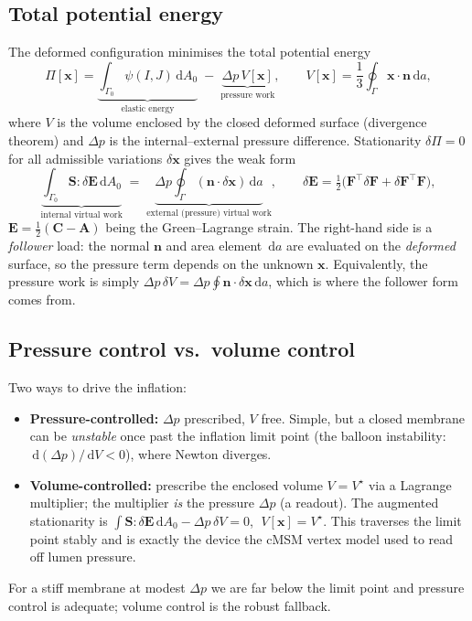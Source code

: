 \documentclass[11pt]{article}
\newcommand{\vv}[1]{\bm{#1}}          %
\newcommand{\nn}{\vv{n}}               %
\newcommand{\FF}{\vv{F}}               %
\newcommand{\CC}{\vv{C}}               %
\newcommand{\Spk}{\vv{S}}               %
\newcommand{\xx}{\vv{x}}               %
\newcommand{\dd}{\,\mathrm{d}}
\begin{document}
\subsection{Total potential energy}
The deformed configuration minimises the total potential energy
\begin{equation}
  \Pi[\xx]=\underbrace{\int_{\Gamma_0}\psi(I,J)\dd A_0}_{\text{elastic energy}}
  \;-\;\underbrace{\Delta p\, V[\xx]}_{\text{pressure work}},
  \qquad
  V[\xx]=\frac13\oint_{\Gamma}\xx\cdot\nn\dd a,
  \label{eq:Pi}
\end{equation}
where $V$ is the volume enclosed by the closed deformed surface (divergence theorem) and
$\Delta p$ is the internal--external pressure difference. Stationarity
$\delta\Pi=0$ for all admissible variations $\delta\xx$ gives the weak form
\begin{equation}
  \underbrace{\int_{\Gamma_0}\Spk:\delta\vv E\dd A_0}_{\text{internal virtual work}}
  \;=\;
  \underbrace{\Delta p\oint_{\Gamma}(\nn\cdot\delta\xx)\dd a}_{\text{external (pressure) virtual work}},
  \qquad
  \delta\vv E=\tfrac12\big(\FF^{\!\top}\delta\FF+\delta\FF^{\!\top}\FF\big),
  \label{eq:weak}
\end{equation}
$\vv E=\tfrac12(\CC-\vv A)$ being the Green--Lagrange strain. The right-hand side is a
\emph{follower} load: the normal $\nn$ and area element $\dd a$ are evaluated on the
\emph{deformed} surface, so the pressure term depends on the unknown $\xx$. Equivalently,
the pressure work is simply $\Delta p\,\delta V=\Delta p\oint\nn\cdot\delta\xx\dd a$,
which is where the follower form comes from.

\subsection{Pressure control vs.\ volume control}
Two ways to drive the inflation:
\begin{itemize}[nosep]
  \item \textbf{Pressure-controlled:} $\Delta p$ prescribed, $V$ free. Simple, but a
        closed membrane can be \emph{unstable} once past the inflation limit point
        (the balloon instability: $\dd(\Delta p)/\dd V<0$), where Newton diverges.
  \item \textbf{Volume-controlled:} prescribe the enclosed volume $V=V^\star$ via a
        Lagrange multiplier; the multiplier \emph{is} the pressure $\Delta p$ (a
        readout). The augmented stationarity is
        $\int\Spk:\delta\vv E\dd A_0-\Delta p\,\delta V=0$, $\;V[\xx]=V^\star$.
        This traverses the limit point stably and is exactly the device the cMSM
        vertex model used to read off lumen pressure.
\end{itemize}
For a stiff membrane at modest $\Delta p$ we are far below the limit point and
pressure control is adequate; volume control is the robust fallback.
\end{document}
